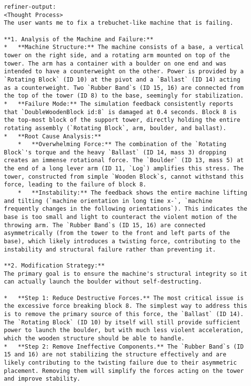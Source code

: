 \begin{lstlisting}
refiner-output:
<Thought Process>
The user wants me to fix a trebuchet-like machine that is failing.

**1. Analysis of the Machine and Failure:**
*   **Machine Structure:** The machine consists of a base, a vertical tower on the right side, and a rotating arm mounted on top of the tower. The arm has a container with a boulder on one end and was intended to have a counterweight on the other. Power is provided by a `Rotating Block` (ID 10) at the pivot and a `Ballast` (ID 14) acting as a counterweight. Two `Rubber Band`s (ID 15, 16) are connected from the top of the tower (ID 8) to the base, seemingly for stabilization.
*   **Failure Mode:** The simulation feedback consistently reports that `DoubleWoodenBlock id:8` is damaged at 0.4 seconds. Block 8 is the top-most block of the support tower, directly holding the entire rotating assembly (`Rotating Block`, arm, boulder, and ballast).
*   **Root Cause Analysis:**
    *   **Overwhelming Force:** The combination of the `Rotating Block`'s torque and the heavy `Ballast` (ID 14, mass 3) dropping creates an immense rotational force. The `Boulder` (ID 13, mass 5) at the end of a long lever arm (ID 11, `Log`) amplifies this stress. The tower, constructed from simple `Wooden Block`s, cannot withstand this force, leading to the failure of block 8.
    *   **Instability:** The feedback shows the entire machine lifting and tilting (`machine orientation in long time x-`, `machine frequently changes in the following orientations`). This indicates the base is too small and light to counteract the violent motion of the throwing arm. The `Rubber Band`s (ID 15, 16) are connected asymmetrically (from the tower to the front and left parts of the base), which likely introduces a twisting force, contributing to the instability and structural failure rather than preventing it.

**2. Modification Strategy:**
The primary goal is to ensure the machine's structural integrity so it can actually launch the boulder without self-destructing.

*   **Step 1: Reduce Destructive Forces.** The most critical issue is the excessive force breaking block 8. The simplest way to address this is to remove the primary source of this force, the `Ballast` (ID 14). The `Rotating Block` (ID 10) by itself will still provide sufficient power to launch the boulder, but with much less violent acceleration, which the wooden structure should be able to handle.
*   **Step 2: Remove Ineffective Components.** The `Rubber Band`s (ID 15 and 16) are not stabilizing the structure effectively and are likely contributing to the twisting failure due to their asymmetric placement. Removing them will simplify the forces acting on the tower and improve stability.


\end{lstlisting}
